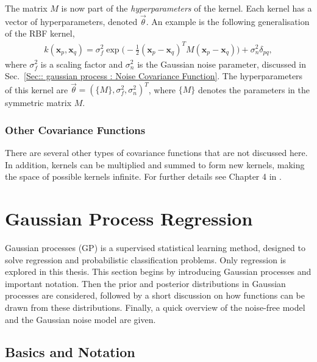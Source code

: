 \documentclass[twoside,english]{uiofysmaster}
\begin{document}
{{The matrix $M$ is now part of the \textit{hyperparameters} of the kernel. Each kernel has a vector of hyperparameters, denoted $\vec{\theta}$. An example is the following generalisation of the RBF kernel, 
\begin{align}\label{Eq:: gaussian process : General RBF kernel}
k(\textbf{x}_p, \textbf{x}_q) = \sigma_f^2 \exp \big(- \frac{1}{2} (\textbf{x}_p - \textbf{x}_q)^T M (\textbf{x}_p - \textbf{x}_q) \big) + \sigma_n^2 \delta_{pq},
\end{align}
where $\sigma_f^2$ is a scaling factor and $\sigma_n^2$ is the Gaussian noise parameter, discussed in Sec.~\ref{Sec:: gaussian process : Noise Covariance Function}. The hyperparameters of this kernel are $\vec{\theta} = (\{M\}, \sigma^2_f, \sigma_n^2)^T$, where $\{M\}$ denotes the parameters in the symmetric matrix $M$. 

\subsubsection{Other Covariance Functions}

There are several other types of covariance functions that are not discussed here. In addition, kernels can be multiplied and summed to form new kernels, making the space of possible kernels infinite. For further details see Chapter 4 in \cite{rasmussen2006gaussian}.




\section{Gaussian Process Regression}\label{Sec: gaussian process : Gaussian Process Regression}

Gaussian processes (GP) is a supervised statistical learning method, designed to solve regression and probabilistic classification problems. Only regression is explored in this thesis. This section begins by introducing Gaussian processes and important notation. Then the prior and posterior distributions in Gaussian processes are considered, followed by a short discussion on how functions can be drawn from these distributions. Finally, a quick overview of the noise-free model and the Gaussian noise model are given.

\subsection{Basics and Notation}\label{Sec:: gaussian process : Basics and Notation}

}}
\end{document}
